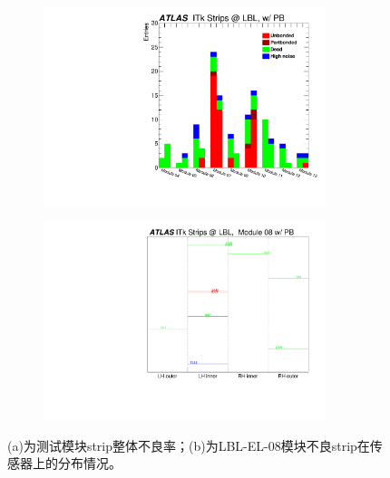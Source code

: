 \begin{figure}[h]
\centering
\begin{subfigure}[b]{0.45\textwidth}
\centering
 \includegraphics[width=0.9\textwidth,angle=-90]{fig/Hists_Bad_wPB.pdf}
 \caption{}
\end{subfigure}
\begin{subfigure}[b]{0.45\textwidth}
\centering
 \includegraphics[width=0.9\textwidth,angle=-90]{fig/BadDistr_LBL-EL-08_wPB.pdf}
 \caption{}
\end{subfigure}
\caption{(a)为测试模块strip整体不良率；(b)为LBL-EL-08模块不良strip在传感器上的分布情况。}
\label{fig:strips_bad_dist}
\end{figure}

